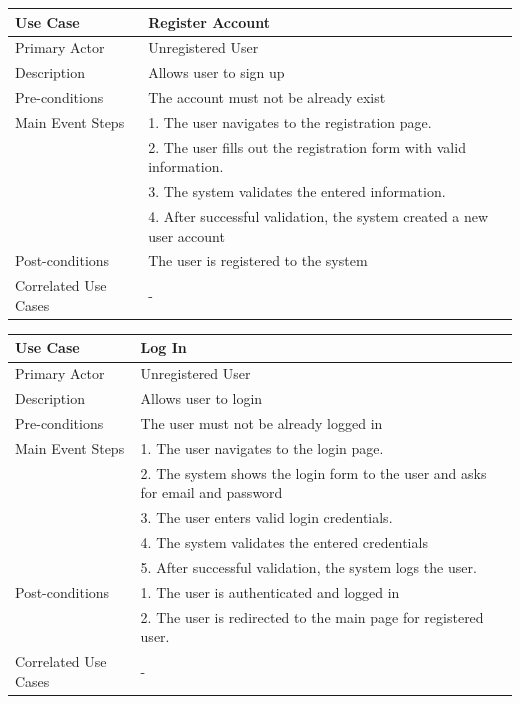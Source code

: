 \begin{longtable}{|p{}|p{}|}
    \hline
    \rowcolor{lightblue}
    \textbf{Use Case} & \textbf{Register Account} \\
    \hline
    Primary Actor & Unregistered User\\
    \hline
    Description & Allows user to sign up\\
    \hline
    Pre-conditions & The account must not be already exist\\
    \hline
    Main Event Steps &   1. The user navigates to the registration page. \\
    & 2. The user fills out the registration form with valid information. \\
    & 3. The system validates the entered information. \\
    & 4. After successful validation, the system created a new user account \\
    \hline
    Post-conditions &The user is registered to the system \\
    \hline
    Correlated Use Cases & -\\
    \hline
\end{longtable}

\begin{longtable}{|p{}|p{}|}
    \hline
    \rowcolor{lightblue}
    \textbf{Use Case} & \textbf{Log In} \\
    \hline
    Primary Actor &Unregistered User\\
    \hline
    Description & Allows user to login \\
    \hline
    Pre-conditions & The user must not be already logged in\\
    \hline
    Main Event Steps & 1. The user navigates to the login page. \\
    & 2. The system shows the login form to the user and asks for email and password \\
    & 3. The user enters valid login credentials. \\
    & 4. The system validates the entered credentials \\
    & 5. After successful validation, the system logs the user. \\
    \hline
    Post-conditions & 1. The user is authenticated and logged in \\
    & 2. The user is redirected to the main page for registered user. \\
    \hline
    Correlated Use Cases & -\\
    \hline
\end{longtable}


